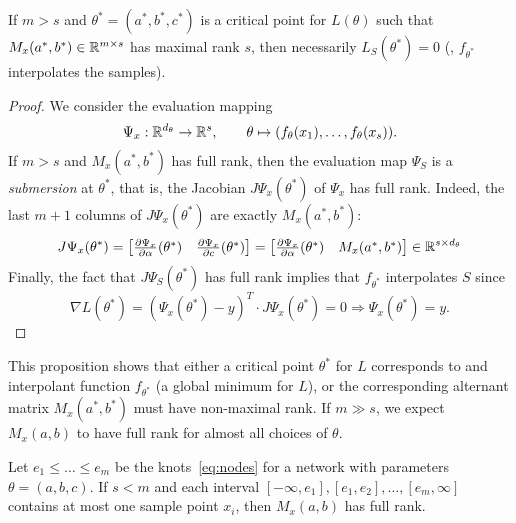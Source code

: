\begin{proposition} If $m > s$ and $\theta^*=(a^*, b^*, c^*)$ is a critical
point for $L(\theta)$ such that $M_x(a^*, b^*) \in \mathbb{R}^{m \times s}$ has maximal rank $s$, then
necessarily $L_S(\theta^*) = 0$ (\ie, $f_{\theta^*}$ interpolates the
samples).
\end{proposition}

\begin{proof} 
    We consider the evaluation mapping
    \begin{equation}
    \Psi_x: \mathbb{R}^{d_\theta} \rightarrow \mathbb{R}^{s}, \qquad \theta \mapsto (f_\theta(x_1),\ldots,f_\theta(x_s)).
    \end{equation}
    If $m > s$ and $M_x(a^*,b^*)$ has full rank, then the evaluation map $\Psi_S$ is a
    \emph{submersion} at $\theta^*$, that is, the Jacobian $J \Psi_x
    (\theta^*)$ of $\Psi_x$ has full rank. Indeed, the last $m+1$ columns of $J\Psi_x(\theta^*)$ are exactly $M_x(a^*,b^*)$:
    \begin{equation} J\Psi_x(\theta^*) = \begin{bmatrix} \frac{\partial
    \Psi_x}{\partial \alpha}(\theta^*) & \frac{\partial \Psi_x}{\partial
    c}(\theta^*)\end{bmatrix} =
    \begin{bmatrix} \frac{\partial \Psi_x}{\partial \alpha}(\theta^*) &
    M_x(a^*,b^*) \end{bmatrix} \in \mathbb{R}^{s \times d_{\theta}}
    \end{equation}
    Finally, the fact that $J \Psi_S(\theta^*)$ has full rank implies that $f_{\theta^*}$
    interpolates $S$ since
    \begin{equation}
    \nabla L(\theta^*) = (\Psi_x(\theta^*) - y)^T \cdot J \Psi_x(\theta^*)
    = 0 \Rightarrow \Psi_x(\theta^*) = y.\end{equation}
\end{proof}
This proposition shows that either a critical point $\theta^*$ for $L$
corresponds to and interpolant function $f_{\theta^*}$ (a global minimum for
$L$), or the corresponding alternant matrix $M_x(a^*,b^*)$ must have
non-maximal rank. If $m \gg s$, we expect $M_x (a,b)$ to have full rank for almost all choices of $\theta$.

\begin{proposition} Let $e_1 \le \ldots \le e_m$ be the knots~\eqref{eq:nodes}
for a network with parameters $\theta = (a,b,c)$. If $s<m$ and each interval $[-\infty, e_1],
[e_1, e_2], \ldots, [e_m, \infty]$ contains at most one sample point $x_i$, then
$M_x(a, b)$ has full rank. 
\end{proposition}

